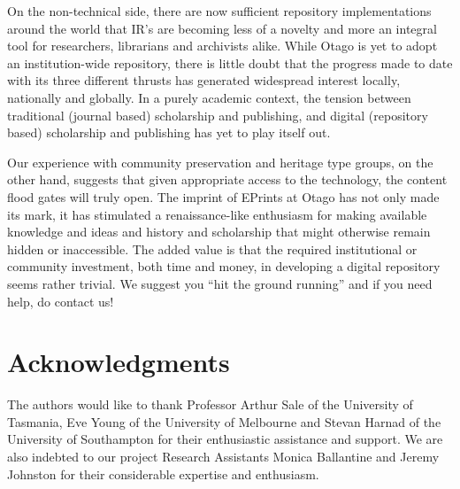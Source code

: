 \documentclass[12pt,pdftex,a4paper,titlepage]{article}
\begin{document}
On the non-technical side, there are now sufficient repository implementations around the world that IR's are becoming less of a novelty and more an integral tool for researchers, librarians and archivists alike. While Otago is yet to adopt an institution-wide repository, there is little doubt that the progress made to date with its three different thrusts has generated widespread interest locally, nationally and globally. In a purely academic context, the tension between traditional (journal based) scholarship and publishing, and digital (repository based) scholarship and publishing has yet to play itself out.

Our experience with community preservation and heritage type groups, on the other hand, suggests that given appropriate access to the technology, the content flood gates will truly open. The imprint of EPrints at Otago has not only made its mark, it has stimulated a renaissance-like enthusiasm for making available knowledge and ideas and history and scholarship that might otherwise remain hidden or inaccessible. The added value is that the required institutional or community investment, both time and money, in developing a digital repository seems rather trivial.  We suggest you ``hit the ground running'' and if you need help, do contact us!


\section*{Acknowledgments}

The authors would like to thank Professor Arthur Sale of the University of Tasmania, Eve Young of the University of Melbourne and Stevan Harnad of the University of Southampton for their enthusiastic assistance and support. We are also indebted to our project Research Assistants Monica Ballantine and Jeremy Johnston for their considerable expertise and enthusiasm.



\end{document}

